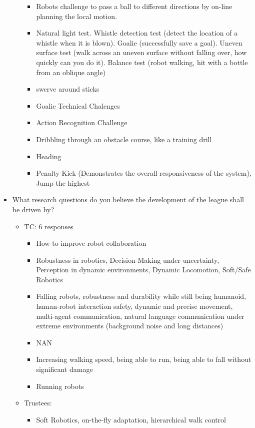 \documentclass{article}
\begin{document}
\begin{itemize}
\begin{itemize}
\begin{itemize}
           \item Robots challenge to pass a ball to different directions by on-line planning the local motion.
           \item Natural light test. Whistle detection test (detect the location of a whistle when it is blown). Goalie (successfully save a goal). Uneven surface test (walk across an uneven surface without falling over, how quickly can you do it). Balance test (robot walking, hit with a bottle from an oblique angle)
           \item swerve around sticks
           \item Goalie Technical Chalenges
           \item Action Recognition Challenge
           \item Dribbling through an obstacle course, like a training drill
           \item Heading
           \item Penalty Kick (Demonstrates the overall responsiveness of the system), Jump the highest
\end{itemize}
\end{itemize}
   \item What research questions do you believe the development of the league shall be driven by?
   \begin{itemize} 
       \item TC: 6 responses
       \begin{itemize} 
           \item How to improve robot collaboration
           \item Robustness in robotics, Decision-Making under uncertainty, Perception in dynamic environments, Dynamic Locomotion, Soft/Safe Robotics
           \item Falling robots, robustness and durability while still being humanoid, human-robot interaction safety, dynamic and precise movement, multi-agent communication, natural language communication under extreme environments (background noise and long distances) 
           \item NAN
           \item Increasing walking speed, being able to run, being able to fall without significant damage
           \item Running robots
   \end{itemize}
       \item Trustees:
       \begin{itemize} 
           \item Soft Robotics, on-the-fly adaptation, hierarchical walk control

\end{itemize}
\end{itemize}
\end{itemize}
\end{document}
